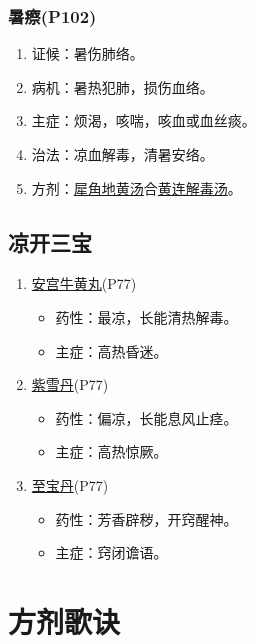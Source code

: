 \documentclass[cn,black,12pt,founder,normal,twocolumn]{elegantnote}
\begin{document}
\subsubsection{暑瘵(P102)}

\begin{enumerate}
    \item 证候：暑伤肺络。
    \item 病机：暑热犯肺，损伤血络。
    \item 主症：烦渴，咳喘，咳血或血丝痰。
    \item 治法：凉血解毒，清暑安络。
    \item 方剂：\uline{犀角地黄汤}合\uline{黄连解毒汤}。
\end{enumerate}

\subsection{凉开三宝}

\begin{enumerate}
    \item \uline{安宫牛黄丸}(P77)
    \begin{itemize}
        \item 药性：最凉，长能清热解毒。
        \item 主症：高热昏迷。
    \end{itemize}
    \item \uline{紫雪丹}(P77)
    \begin{itemize}
        \item 药性：偏凉，长能息风止痉。
        \item 主症：高热惊厥。
    \end{itemize}
    \item \uline{至宝丹}(P77)
    \begin{itemize}
        \item 药性：芳香辟秽，开窍醒神。
        \item 主症：窍闭谵语。
    \end{itemize}
\end{enumerate}

\section{方剂歌诀}
\end{document}
